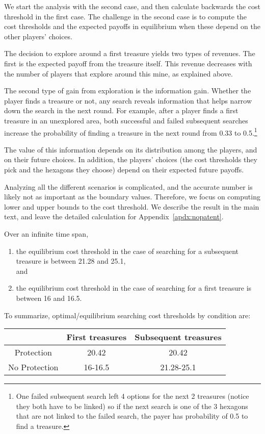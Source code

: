We start the analysis with the second case, and then calculate backwards the cost threshold in the first case. The challenge in the second case is to compute the cost thresholds and the expected payoffs in equilibrium when these depend on the other players' choices.

The decision to explore around a first treasure yields two types of revenues. The first is the expected payoff from the treasure itself. This revenue decreases with the number of players that explore around this mine, as explained above.

The second type of gain from exploration is the information gain. Whether the player finds a treasure or not, any search reveals information that helps narrow down the search in the next round. For example, after a player finds a first treasure in an unexplored area, both successful and failed subsequent searches increase the probability of finding a treasure in the next round from 0.33 to 0.5.\footnote{One failed subsequent search left 4 options for the next 2 treasures (notice they both have to be linked) so if the next search is one of the 3 hexagons that are not linked to the failed search, the payer has probability of 0.5 to find a treasure.}

The value of this information depends on its distribution among the players, and on their future choices. In addition, the players' choices (the cost thresholds they pick and the hexagons they choose) depend on their expected future payoffs. 

Analyzing all the different scenarios is complicated, and the accurate number is likely not as important as the boundary values.
Therefore, we focus on computing lower and upper bounds to the cost threshold. We describe the result in the main text, and leave the detailed calculation for Appendix~\ref{apdx:nopatent}. 
\begin{prop}
Over an infinite time span, 
\begin{enumerate}
    \item the equilibrium cost threshold in the case of searching for a subsequent treasure is between 21.28 and 25.1,
\\ and
    \item the equilibrium cost threshold in the case of searching for a first treasure is between 16 and 16.5.
\end{enumerate} 
\end{prop}

To summarize, optimal/equilibrium searching cost thresholds by condition are:
\begin{center}
 \begin{tabular}{c|| c c } 
 \hline
  & First treasures & Subsequent treasures  \\ [0.5ex] 
 \hline\hline
 Protection & 20.42 & 20.42 \\ 
 \hline
 No Protection & 16-16.5 & 21.28-25.1  \\
 \hline

\end{tabular}
\end{center}


